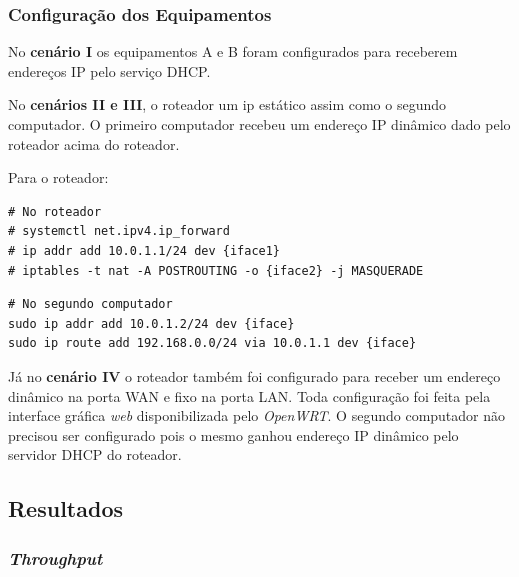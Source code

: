 

\subsubsection{Configuração dos Equipamentos}
No \textbf{cenário I} os equipamentos A e B foram configurados para receberem endereços \ac{IP} pelo serviço \ac{DHCP}.  

No \textbf{cenários II e III}, o roteador um ip estático assim como o segundo computador. O primeiro computador recebeu um endereço \ac{IP} dinâmico dado pelo roteador acima do roteador. 

Para o roteador: 

\begin{verbatim}
# No roteador
# systemctl net.ipv4.ip_forward 
# ip addr add 10.0.1.1/24 dev {iface1} 
# iptables -t nat -A POSTROUTING -o {iface2} -j MASQUERADE 
\end{verbatim}

\begin{verbatim}
# No segundo computador
sudo ip addr add 10.0.1.2/24 dev {iface}
sudo ip route add 192.168.0.0/24 via 10.0.1.1 dev {iface}
\end{verbatim}

Já no \textbf{cenário IV} o roteador também foi configurado para receber um endereço dinâmico na porta \ac{WAN} e fixo na porta \ac{LAN}. Toda configuração foi feita pela interface gráfica \textit{web} disponibilizada pelo \textit{OpenWRT}. O segundo computador não precisou ser configurado pois o mesmo ganhou endereço \ac{IP} dinâmico pelo servidor \ac{DHCP} do roteador.


\subsection{Resultados}
\subsubsection{\textit{Throughput}}

